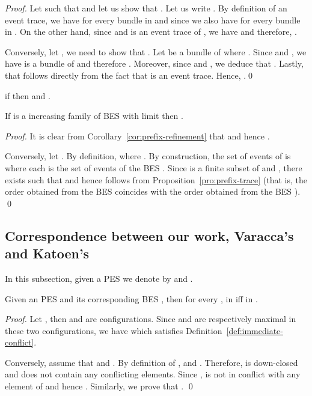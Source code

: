 \documentclass{llncs}
\newcommand{\<}{\langle}
\renewcommand{\>}{\rangle}
\begin{document}
\begin{proof}
Let  such that  and let us show that . Let us write . By definition of an event trace, we have  for every bundle  in  and since  we also have  for every bundle  in . On the other hand, since  and  is an event trace of , we have  and therefore, .

Conversely, let , we need to show that . Let  be a bundle of  where . Since  and , we have  is a bundle of  and therefore . Moreover, since  and , we deduce that . Lastly, that  follows directly from the fact that  is an event trace. Hence, .\qed
\end{proof}

\begin{corollary}\label{cor:prefix-refinement}
if  then  and .
\end{corollary}

\begin{corollary}\label{cor:limit-lposet}
If  is a increasing family of BES with limit  then .
\end{corollary}

\begin{proof}
It is clear from Corollary~\ref{cor:prefix-refinement} that  and hence .

Conversely, let . By definition,  where . By construction, the set of events of  is  where each  is the set of events of the BES . Since  is a finite subset of  and , there exists  such that  and hence  follows from Proposition~\ref{pro:prefix-trace} (that is, the order  obtained from the BES  coincides with the order obtained from the BES ). \qed
\end{proof}

\subsection{Correspondence between our work, Varacca's and Katoen's}

In this subsection, given a PES  we denote by  and .

\begin{proposition}\label{pro:immediate-conflict}
Given an PES  and its corresponding BES , then for every ,  in  iff  in .
\end{proposition}

\begin{proof}
Let , then  and  are configurations. Since  and  are respectively maximal in these two configurations, we have  which satisfies Definition~\ref{def:immediate-conflict}.

Conversely, assume that  and . By definition of ,  and . Therefore,  is down-closed and does not contain any conflicting elements. Since ,  is not in conflict with any element of  and hence . Similarly, we prove that . \qed
\end{proof}
\end{document}
